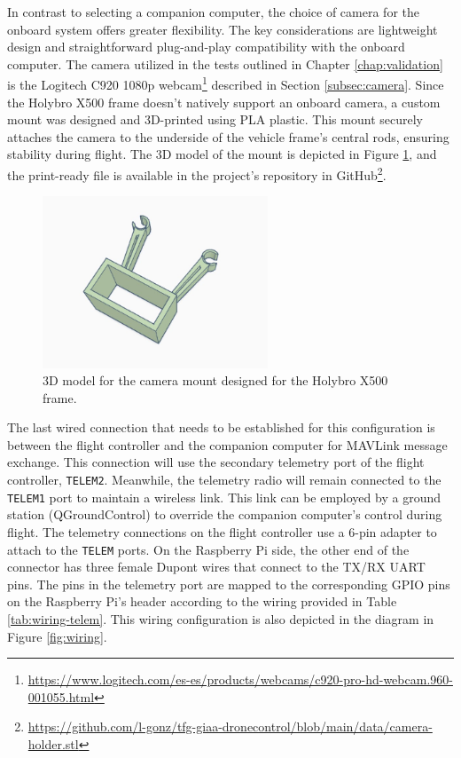 In contrast to selecting a companion computer, the choice of camera for the onboard system offers greater flexibility. The key considerations are lightweight design and straightforward plug-and-play compatibility with the onboard computer. The camera utilized in the tests outlined in Chapter \ref{chap:validation} is the Logitech C920 1080p webcam\footnote{\url{https://www.logitech.com/es-es/products/webcams/c920-pro-hd-webcam.960-001055.html}} described in Section \ref{subsec:camera}. Since the Holybro X500 frame doesn't natively support an onboard camera, a custom mount was designed and 3D-printed using PLA plastic. This mount securely attaches the camera to the underside of the vehicle frame's central rods, ensuring stability during flight. The 3D model of the mount is depicted in Figure \ref{fig:camera-holder-3d}, and the print-ready file is available in the project's repository in GitHub\footnote{\url{https://github.com/l-gonz/tfg-giaa-dronecontrol/blob/main/data/camera-holder.stl}}.

\begin{figure}
  \centering
  \includegraphics[width=0.6\textwidth, keepaspectratio]{img/cam-holder.jpg}
  \caption{3D model for the camera mount designed for the Holybro X500 frame.}
  \label{fig:camera-holder-3d}
\end{figure}

The last wired connection that needs to be established for this configuration is between the flight controller and the companion computer for MAVLink message exchange.
This connection will use the secondary telemetry port of the flight controller, \texttt{TELEM2}.
Meanwhile, the telemetry radio will remain connected to the \texttt{TELEM1} port to maintain a wireless link.
This link can be employed by a ground station (QGroundControl) to override the companion computer's control during flight.
The telemetry connections on the flight controller use a 6-pin adapter to attach to the \texttt{TELEM} ports.
On the Raspberry Pi side, the other end of the connector has three female Dupont wires that connect to the TX/RX UART pins. The pins in the telemetry port are mapped to the corresponding GPIO pins on the Raspberry Pi's header according to the wiring provided in Table \ref{tab:wiring-telem}. This wiring configuration is also depicted in the diagram in Figure \ref{fig:wiring}.

